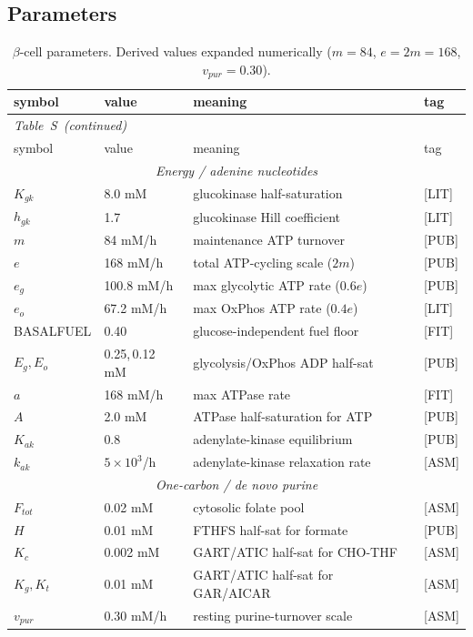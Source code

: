 \documentclass[11pt]{article}
\renewcommand{\thetable}{S\arabic{table}}
\begin{document}
\subsection{Parameters}
\begin{longtable}{@{}llll@{}}
\caption{$\beta$-cell parameters. Derived values expanded numerically
($m{=}84$, $e{=}2m{=}168$, $v_{pur}{=}0.30$).}\label{tab:betaparams}\\
\toprule
symbol & value & meaning & tag\\
\midrule
\endfirsthead
\multicolumn{4}{l}{\small\itshape Table~\thetable\ (continued)}\\
\toprule symbol & value & meaning & tag\\ \midrule
\endhead
\multicolumn{4}{c}{\textit{Energy / adenine nucleotides}}\\
$K_{gk}$ & 8.0 mM & glucokinase half-saturation & [LIT]\\
$h_{gk}$ & 1.7 & glucokinase Hill coefficient & [LIT]\\
$m$ & 84 mM/h & maintenance ATP turnover & [PUB]\\
$e$ & 168 mM/h & total ATP-cycling scale ($2m$) & [PUB]\\
$e_g$ & 100.8 mM/h & max glycolytic ATP rate ($0.6e$) & [PUB]\\
$e_o$ & 67.2 mM/h & max OxPhos ATP rate ($0.4e$) & [LIT]\\
BASALFUEL & 0.40 & glucose-independent fuel floor & [FIT]\\
$E_g,E_o$ & 0.25,\,0.12 mM & glycolysis/OxPhos ADP half-sat & [PUB]\\
$a$ & 168 mM/h & max ATPase rate & [FIT]\\
$A$ & 2.0 mM & ATPase half-saturation for ATP & [PUB]\\
$K_{ak}$ & 0.8 & adenylate-kinase equilibrium & [PUB]\\
$k_{ak}$ & $5\times10^{3}$/h & adenylate-kinase relaxation rate & [ASM]\\
\midrule
\multicolumn{4}{c}{\textit{One-carbon / de novo purine}}\\
$F_{tot}$ & 0.02 mM & cytosolic folate pool & [ASM]\\
$H$ & 0.01 mM & FTHFS half-sat for formate & [PUB]\\
$K_c$ & 0.002 mM & GART/ATIC half-sat for CHO-THF & [ASM]\\
$K_g,K_t$ & 0.01 mM & GART/ATIC half-sat for GAR/AICAR & [ASM]\\
$v_{pur}$ & 0.30 mM/h & resting purine-turnover scale & [ASM]\\

\end{longtable}
\end{document}
